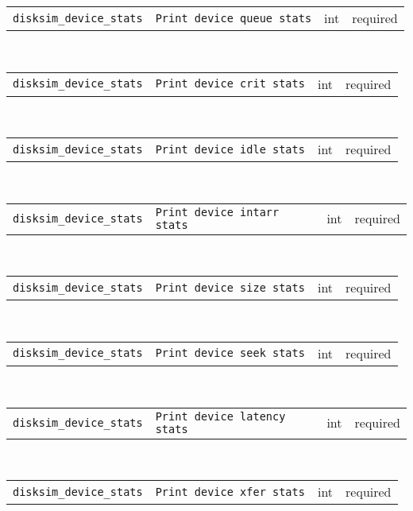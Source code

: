 \noindent 
\begin{tabular}{|p{1.5in}|p{3.5in}|p{0.5in}|p{0.5in}|}
\cline{1-4}
\texttt{disksim\_device\_stats} & \texttt{Print device queue stats} & int & required \\ 
\cline{1-4}
\end{tabular}\\ 
\noindent 
\begin{tabular}{|p{1.5in}|p{3.5in}|p{0.5in}|p{0.5in}|}
\cline{1-4}
\texttt{disksim\_device\_stats} & \texttt{Print device crit stats} & int & required \\ 
\cline{1-4}
\end{tabular}\\ 
\noindent 
\begin{tabular}{|p{1.5in}|p{3.5in}|p{0.5in}|p{0.5in}|}
\cline{1-4}
\texttt{disksim\_device\_stats} & \texttt{Print device idle stats} & int & required \\ 
\cline{1-4}
\end{tabular}\\ 
\noindent 
\begin{tabular}{|p{1.5in}|p{3.5in}|p{0.5in}|p{0.5in}|}
\cline{1-4}
\texttt{disksim\_device\_stats} & \texttt{Print device intarr stats} & int & required \\ 
\cline{1-4}
\end{tabular}\\ 
\noindent 
\begin{tabular}{|p{1.5in}|p{3.5in}|p{0.5in}|p{0.5in}|}
\cline{1-4}
\texttt{disksim\_device\_stats} & \texttt{Print device size stats} & int & required \\ 
\cline{1-4}
\end{tabular}\\ 
\noindent 
\begin{tabular}{|p{1.5in}|p{3.5in}|p{0.5in}|p{0.5in}|}
\cline{1-4}
\texttt{disksim\_device\_stats} & \texttt{Print device seek stats} & int & required \\ 
\cline{1-4}
\end{tabular}\\ 
\noindent 
\begin{tabular}{|p{1.5in}|p{3.5in}|p{0.5in}|p{0.5in}|}
\cline{1-4}
\texttt{disksim\_device\_stats} & \texttt{Print device latency stats} & int & required \\ 
\cline{1-4}
\end{tabular}\\ 
\noindent 
\begin{tabular}{|p{1.5in}|p{3.5in}|p{0.5in}|p{0.5in}|}
\cline{1-4}
\texttt{disksim\_device\_stats} & \texttt{Print device xfer stats} & int & required \\ 
\cline{1-4}
\end{tabular}\\ 
